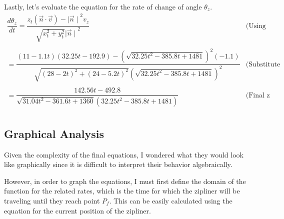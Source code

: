 \documentclass[12pt]{article}
\begin{document}
Lastly, let's evaluate the equation for the rate of change of angle $\theta_z$. 
$$
\begin{array}{l|c}
    \dfrac{d\theta_z}{dt} = \dfrac{z_t(\vec n \cdot \vec v) - {\mid \vec n \mid}^2 v_z }{\sqrt{x_t^2 + y_t^2} {\mid \vec n \mid}^2} & \text{(Using Equation 3)}\\ \\
    = \dfrac{(11-1.1t)(32.25t-192.9) - \left( \sqrt{32.25t^2 - 385.8t + 1481} \right)^2 (-1.1)}{\sqrt{(28-2t)^2 + (24-5.2t)^2} \left( \sqrt{32.25t^2 - 385.8t + 1481} \right) ^2} & \text{(Substitute values)}\\ \\
    = \boxed{\dfrac{142.56t-492.8}{\sqrt{31.04t^2-361.6t+1360} \left(32.25t^2 - 385.8t + 1481\right)}} & \text{(Final z equation)}\\
 \end{array} 
$$

\subsection{Graphical Analysis}
Given the complexity of the final equations, I wondered what they would look like graphically since it is difficult to interpret their behavior algebraically. 

However, in order to graph the equations, I must first define the domain of the function for the related rates, which is the time for which the zipliner will be traveling until they reach point $P_f$. This can be easily calculated using the equation for the current position of the zipliner. 
\end{document}
